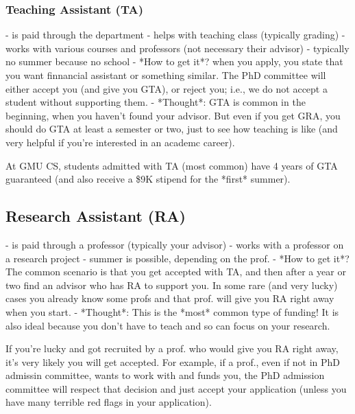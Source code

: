 \documentclass[10pt]{article}
\begin{document}
\subsubsection{Teaching Assistant (TA)}
- is paid through the department
- helps with teaching class (typically grading)
- works with various courses and professors (not necessary their advisor)
- typically no summer because no school
- *How to get it*?  when you apply, you state that you want finnancial assistant or something similar. The PhD committee will either accept you (and give you GTA), or reject you; i.e., we do not accept a student without supporting them.
- *Thought*: GTA is common in the beginning, when you haven't found your advisor.  But even if you get GRA, you should do GTA at least a semester or two, just to see how teaching is like (and very helpful if you're interested in an academc career).

\begin{tcolorbox}[left=1pt,right=1pt,top=1pt,bottom=1pt]
At GMU CS, students admitted with TA (most common) have  4 years of GTA guaranteed (and also receive a \$9K stipend for the *first* summer).
\end{tcolorbox}

\subsection{Research Assistant (RA)}
- is paid through a professor (typically your advisor)
- works with a professor on a research project
- summer is possible, depending on the prof.
- *How to get it*?  The common scenario is that you get accepted with TA, and then after a year or two find an advisor who has RA to support you. In some rare (and very lucky) cases you already know some profs  and that prof. will give you RA right away when you start.
- *Thought*: This is the *most* common type of funding!  It is also ideal because you don't have to teach and so can focus on your research.
    

\begin{tcolorbox}[left=1pt,right=1pt,top=1pt,bottom=1pt]
If you're lucky and got recruited by a prof. who would give you RA right away, it's very likely you will get accepted.  For example, if a prof., even if not in PhD admissin committee, wants to work with and funds you, the PhD admission committee will respect that decision and just accept your application (unless you have many terrible red flags in your application).
\end{tcolorbox}
\end{document}
